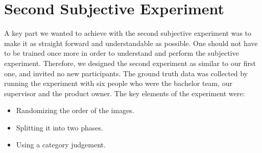 \section{Second Subjective Experiment}
\label{sec:secondse}
A key part we wanted to achieve with the second subjective experiment was to make it as straight forward and understandable as possible. One should not have to be trained once more in order to understand and perform the subjective experiment. Therefore, we designed the second experiment as similar to our first one, and invited no new participants. The ground truth data was collected by running the experiment with six people who were the bachelor team, our supervisor and the product owner. The key elements of the experiment were: 
\begin{itemize}
    \item Randomizing the order of the images.
    \item Splitting it into two phases. 
    \item Using a category judgement.
\end{itemize}

